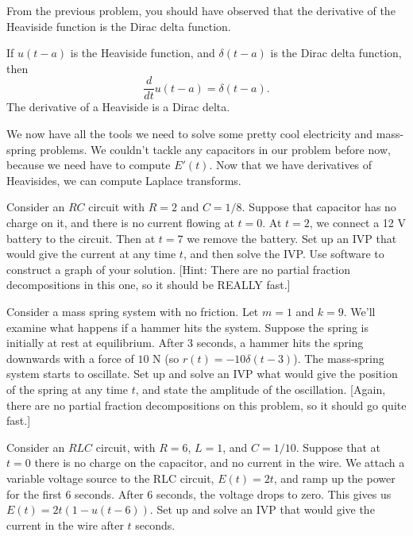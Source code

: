 From the previous problem, you should have observed that the derivative of the Heaviside function is the Dirac delta function. 
\begin{theorem}
 If $u(t-a)$ is the Heaviside function, and $\delta(t-a)$ is the Dirac delta function, then 
$$\frac{d}{dt}u(t-a) = \delta(t-a).$$
The derivative of a Heaviside is a Dirac delta. 
\end{theorem}

We now have all the tools we need to solve some pretty cool electricity and mass-spring problems.  We couldn't tackle any capacitors in our problem before now, because we need have to compute $E'(t)$.  Now that we have derivatives of Heavisides, we can compute Laplace transforms.

\begin{problem}
Consider an $RC$ circuit with $R=2$ and $C=1/8$.  
Suppose that capacitor has no charge on it, and there is no current flowing at $t=0$.  At $t=2$, we connect a 12 V battery to the circuit.  Then at $t=7$ we remove the battery.  Set up an IVP that would give the current at any time $t$, and then solve the IVP.  Use software to construct a graph of your solution. [Hint: There are no partial fraction decompositions in this one, so it should be REALLY fast.] 
\end{problem}

\begin{problem}
Consider a mass spring system with no friction.  Let $m=1$ and $k=9$. We'll examine what happens if a hammer hits the system.
Suppose the spring is initially at rest at equilibrium.  After 3 seconds, a hammer hits the spring downwards with a force of $10$ N (so $r(t) = -10\delta (t-3)$). The mass-spring system starts to oscillate. Set up and solve an IVP what would give the position of the spring at any time $t$, and state the amplitude of the oscillation. [Again, there are no partial fraction decompositions on this problem, so it should go quite fast.]
\end{problem}

\begin{problem}
Consider an $RLC$ circuit, with $R=6$, $L=1$, and $C=1/10$. Suppose that at $t=0$ there is no charge on the capacitor, and no current in the wire. We attach a variable voltage source to the RLC circuit, $E(t) = 2t$, and ramp up the power for the first 6 seconds.  After 6 seconds, the voltage drops to zero.  This gives us $E(t) = 2t(1-u(t-6))$.  Set up and solve an IVP that would give the current in the wire after $t$ seconds. 
\end{problem}

